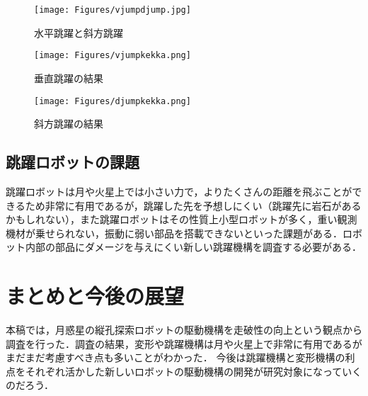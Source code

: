 \documentclass[a4paper,11pt,dvipdfmx.uplatex]{jsarticle}
\begin{document}
\begin{figure} [htbp]
	\texttt{[image: Figures/vjumpdjump.jpg]}
	\caption{水平跳躍と斜方跳躍\cite{藤岡}}
	\label{水平跳躍と射法跳躍}
\end{figure}

\begin{figure} [htbp]
	\texttt{[image: Figures/vjumpkekka.png]}
	\caption{
	   垂直跳躍の結果\cite{藤岡}}
	\label{垂直跳躍}
\end{figure}

\begin{figure} [htbp]
	\texttt{[image: Figures/djumpkekka.png]}
	\caption{
	   斜方跳躍の結果\cite{藤岡}}
	\label{射法跳躍}
\end{figure}




\subsection{跳躍ロボットの課題}
跳躍ロボットは月や火星上では小さい力で，よりたくさんの距離を飛ぶことができるため非常に有用であるが，跳躍した先を予想しにくい（跳躍先に岩石があるかもしれない），また跳躍ロボットはその性質上小型ロボットが多く，重い観測機材が乗せられない，振動に弱い部品を搭載できないといった課題がある．ロボット内部の部品にダメージを与えにくい新しい跳躍機構を調査する必要がある．

\section{まとめと今後の展望}
本稿では，月惑星の縦孔探索ロボットの駆動機構を走破性の向上という観点から調査を行った．調査の結果，変形や跳躍機構は月や火星上で非常に有用であるがまだまだ考慮すべき点も多いことがわかった．
今後は跳躍機構と変形機構の利点をそれぞれ活かした新しいロボットの駆動機構の開発が研究対象になっていくのだろう．
\end{document}
